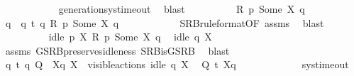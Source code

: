 \begin{isabellebody}
\ \ \ \ \ \ \ \ \ \ \isamarkupfalse%
\ generation{\isacharunderscore}{\kern0pt}sys{\isacharunderscore}{\kern0pt}timeout\ \isamarkupfalse%
\ blast\isanewline
\ \ \ \ \ \ \ \ \isamarkupfalse%
\ {\isacartoucheopen}R\ p\ {\isacharparenleft}{\kern0pt}Some\ X{\isacharparenright}{\kern0pt}\ q{\isacartoucheclose}\ \isamarkupfalse%
\ q{\isacharprime}{\kern0pt}\ \ {\isacartoucheopen}q\ {\isasymlongmapsto}t\ q{\isacharprime}{\kern0pt}{\isacartoucheclose}\ {\isacartoucheopen}R\ p{\isacharprime}{\kern0pt}\ {\isacharparenleft}{\kern0pt}Some\ X{\isacharparenright}{\kern0pt}\ q{\isacharprime}{\kern0pt}{\isacartoucheclose}\isanewline
\ \ \ \ \ \ \ \ \ \ \isamarkupfalse%
\ SRB{\isacharunderscore}{\kern0pt}ruleformat{\isacharparenleft}{\kern0pt}{}{\isacharparenright}{\kern0pt}{\isacharbrackleft}{\kern0pt}OF\ assms{\isacharparenleft}{\kern0pt}{}{\isacharparenright}{\kern0pt}{\isacharbrackright}{\kern0pt}\ \isamarkupfalse%
\ blast\isanewline
\ \ \ \ \ \ \ \ \isamarkupfalse%
\ {\isacartoucheopen}idle\ p\ X{\isacartoucheclose}\ {\isacartoucheopen}R\ p\ {\isacharparenleft}{\kern0pt}Some\ X{\isacharparenright}{\kern0pt}\ q{\isacartoucheclose}\ \isamarkupfalse%
\ {\isacartoucheopen}idle\ q\ X{\isacartoucheclose}\isanewline
\ \ \ \ \ \ \ \ \ \ \isamarkupfalse%
\ assms\ GSRB{\isacharunderscore}{\kern0pt}preserves{\isacharunderscore}{\kern0pt}idleness\ SRB{\isacharunderscore}{\kern0pt}is{\isacharunderscore}{\kern0pt}GSRB\ \isamarkupfalse%
\ blast\isanewline
\ \ \ \ \ \ \ \ \isamarkupfalse%
\ {\isacartoucheopen}q\ {\isasymlongmapsto}t\ q{\isacharprime}{\kern0pt}{\isacartoucheclose}\ {\isacartoucheopen}Q\ {\isacharequal}{\kern0pt}\ {\isasymtheta}{\isacharbrackleft}{\kern0pt}X{\isacharbrackright}{\kern0pt}{\isacharparenleft}{\kern0pt}q{\isacharparenright}{\kern0pt}{\isacartoucheclose}\ {\isacartoucheopen}X\ {\isasymsubseteq}\ visible{\isacharunderscore}{\kern0pt}actions{\isacartoucheclose}\ {\isacartoucheopen}idle\ q\ X{\isacartoucheclose}\ \isamarkupfalse%
\ {\isacartoucheopen}Q\ {\isasymlongmapsto}\isactrlsup {\isasymtheta}t\ {\isasymtheta}{\isacharbrackleft}{\kern0pt}X{\isacharbrackright}{\kern0pt}{\isacharparenleft}{\kern0pt}q{\isacharprime}{\kern0pt}{\isacharparenright}{\kern0pt}{\isacartoucheclose}\ \isanewline
\ \ \ \ \ \ \ \ \ \ \isamarkupfalse%
\ sys{\isacharunderscore}{\kern0pt}timeout\ \isamarkupfalse%

\end{isabellebody}
